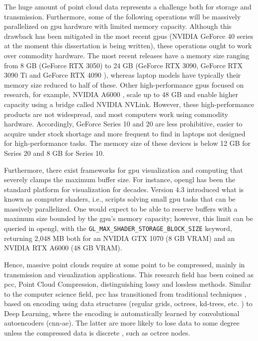 The huge amount of point cloud data represents a challenge both for storage and transmission. Furthermore, some of the following operations will be massively parallelized on \acrshort{gpu} hardware with limited memory capacity. Although this drawback has been mitigated in the most recent \acrshort{gpu}s (NVIDIA GeForce 40 series at the moment this dissertation is being written), these operations ought to work over commodity hardware. The most recent releases have a memory size ranging from 8 GB (GeForce RTX 3050) to 24 GB (GeForce RTX 3090, GeForce RTX 3090 Ti \cite{nvidia_nvidia_nodate-2} and GeForce RTX 4090 \cite{nvidia_nvidia_nodate-1}), whereas laptop models have typically their memory size reduced to half of these. Other high-performance \acrshort{gpu}s focused on research, for example, NVIDIA A6000 \cite{nvidia_nvidia_nodate}, scale up to 48 GB and enable higher capacity using a bridge called NVIDIA NVLink. However, these high-performance products are not widespread, and most computers work using commodity hardware. Accordingly, GeForce Series 10 and 20 are less prohibitive, easier to acquire under stock shortage and more frequent to find in laptops not designed for high-performance tasks. The memory size of these devices is below 12 GB for Series 20 and 8 GB for Series 10. 

Furthermore, there exist frameworks for \acrshort{gpu} visualization and computing that severely clamps the maximum buffer size. For instance, \acrshort{opengl} has been the standard platform for visualization for decades. Version 4.3 introduced what is known as computer shaders, i.e., scripts solving small \acrshort{gpu} tasks that can be massively parallelized. One would expect to be able to reserve buffers with a maximum size bounded by the \acrshort{gpu}'s memory capacity; however, this limit can be queried in \acrshort{opengl}, with the \scriptsize \verb|GL_MAX_SHADER_STORAGE_BLOCK_SIZE| \normalsize keyword, returning 2,048 MB both for an NVIDIA GTX 1070 (8 GB VRAM) and an NVIDIA RTX A6000 (48 GB VRAM).

Hence, massive point clouds require at some point to be compressed, mainly in transmission and visualization applications. This research field has been coined as \acrshort{pcc}, Point Cloud Compression, distinguishing lossy and lossless methods. Similar to the computer science field, \acrshort{pcc} has transitioned from traditional techniques \cite{bui_comparative_2021}, based on encoding using data structures (regular grids, octrees, kd-trees, etc. \cite{cao_3d_2019}) to Deep Learning, where the encoding is automatically learned by convolutional autoencoders (\acrshort{cnn-ae}). The latter are more likely to lose data to some degree unless the compressed data is discrete \cite{que_voxelcontext-net_2021}, such as octree nodes. 

